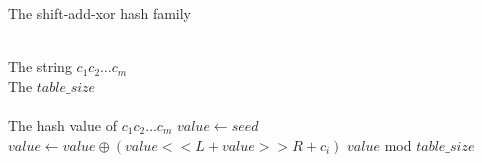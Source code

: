 \documentclass[legalpaper]{article}
\begin{document}





\begin{algorithm}
  \caption{The \textsf{shift-add-xor} hash family}
  \label{alg:hash fun}
  \begin{algorithmic}[1]
    \REQUIRE ~~\\
    The string $c_1c_2 \dots c_m$  \\
    The $table\_size$  \\
    \ENSURE ~~\\
    The hash value of $c_1c_2 \dots c_m$
    \STATE 
    \STATE $value \leftarrow seed$
    \STATE $value \leftarrow value \oplus (value << L + value >> R + c_i)$
    \ENDFOR
    \RETURN $value$ mod $table\_size$
  \end{algorithmic}
\end{algorithm}
\end{document}

